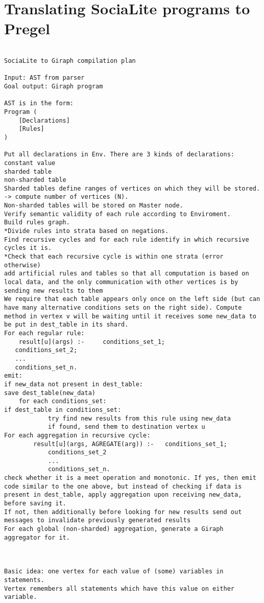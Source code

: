 
\chapter{Translating SociaLite programs to Pregel}\label{r:s2p}


\begin{verbatim}

SociaLite to Giraph compilation plan

Input: AST from parser
Goal output: Giraph program

AST is in the form:
Program (
	[Declarations]
	[Rules]
)

Put all declarations in Env. There are 3 kinds of declarations:
constant value
sharded table
non-sharded table
Sharded tables define ranges of vertices on which they will be stored. -> compute number of vertices (N).
Non-sharded tables will be stored on Master node.
Verify semantic validity of each rule according to Enviroment.
Build rules graph.
*Divide rules into strata based on negations.
Find recursive cycles and for each rule identify in which recursive cycles it is.
*Check that each recursive cycle is within one strata (error otherwise)
add artificial rules and tables so that all computation is based on local data, and the only communication with other vertices is by sending new results to them
We require that each table appears only once on the left side (but can have many alternative conditions sets on the right side). Compute method in vertex v will be waiting until it receives some new_data to be put in dest_table in its shard.
For each regular rule:
	result[u](args) :- 	   conditions_set_1;
   conditions_set_2;
   ...
   conditions_set_n.
emit:
if new_data not present in dest_table:
save dest_table(new_data)
	for each conditions_set:
if dest_table in conditions_set:
			try find new results from this rule using new_data
			if found, send them to destination vertex u
For each aggregation in recursive cycle:
		result[u](args, AGREGATE(arg)) :- 	conditions_set_1;
   			conditions_set_2
   			...
   			conditions_set_n.
check whether it is a meet operation and monotonic. If yes, then emit code similar to the one above, but instead of checking if data is present in dest_table, apply aggregation upon receiving new_data, before saving it.
If not, then additionally before looking for new results send out messages to invalidate previously generated results
For each global (non-sharded) aggregation, generate a Giraph aggregator for it.



Basic idea: one vertex for each value of (some) variables in statements.
Vertex remembers all statements which have this value on either variable.


\end{verbatim}
